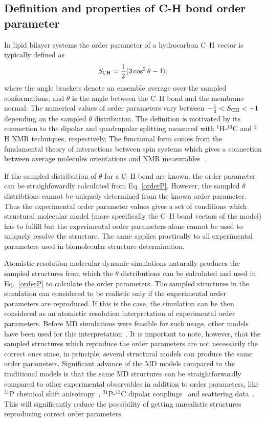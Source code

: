 \documentclass[aps,prl,superscriptaddress,twocolumn]{revtex4}
\begin{document}
\subsection{Definition and properties of C-H bond order parameter}\label{OPdefinition}
In lipid bilayer systems the order parameter of a hydrocarbon C--H vector is typically defined as 
\begin{equation}\label{orderP}
S_{{\rm CH}}=\frac{1}{2}\langle 3 \cos^2 \theta-1 \rangle,
\end{equation} 
where the angle brackets denote an ensemble average over the sampled conformations, and $\theta$ is the 
angle between the C--H bond and the membrane normal.
The numerical values of order parameters vary between $-\frac{1}{2} < S_{{\rm CH}} < +1$
depending on the sampled $\theta$ distribution.
The definition is motivated by its connection to the dipolar and quadrupolar splitting measured with
$^1$H-$^{13}$C and $^2$H NMR techniques, respectively. The functional form comes from 
the fundamental theory of interactions between spin systems which gives a connection between 
average molecules orientations and NMR measurables~\cite{abragam}. 

If the sampled distribution of $\theta$ for a C--H bond are known, the order parameter
can be straighfowardly calculated from Eq. \ref{orderP}. However, the sampled $\theta$ 
distribtions cannot be uniquely determined from the known order parameter. Thus the experimental
order parameter values gives a set of conditions which structural molecular model 
(more specifically the C--H bond vectors of the model) has to fulfill
but the experimental order parameters alone cannot be used to uniquely 
resolve the structure. The same applies practically to all
experimental parameters used in biomolecular structure determination. 

Atomistic resolution molecular dynamic simulations naturally produces the
sampled structures from which the $\theta$ distributions can be calculated and
used in Eq.~\ref{orderP} to calculate the order parameters.
The sampled structures in the simulation can considered to be realistic
only if the experimental order parameters are reproduced.
If this is the case, the simulation can be then considered 
as an atomistic resolution interpretation of experimental order parameters.
Before MD simulations were feasible for such usage, other models have been used for this interpretation~\cite{??}.
It is important to note, however, that the sampled structures which reproduce the order parameters are not 
necessarily the correct ones since, in principle, several structural models can produce the same order parameters. 
Significant advance of the MD models compared to the traditional models is that the same MD 
structures can be straightforwardly compared to other experimental observables in addition to order parameters, 
like $^{31}$P chemical shift anisotropy~\cite{chowdhary13}, $^{31}$P-$^{13}$C dipolar couplings~\cite{prakash10}
and scattering data~\cite{??}. This will significantly reduce the 
possibility of getting unrealistic structures reproducing correct order parameters.
\end{document}
